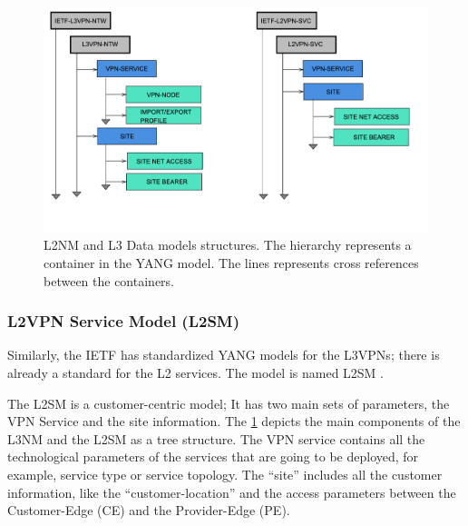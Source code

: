 \documentclass[10pt, conference]{IEEEtran}
\begin{document}

\begin{figure}
	\centering
		\includegraphics[width=\linewidth]{figs/diagram-10.png}
	\caption{L2NM and L3 Data models structures. The hierarchy represents a container in the YANG model. The  lines represents cross references between the containers.}
	\label{FIG:l3nm} 
\end{figure}

\subsubsection{L2VPN Service Model (L2SM)}
\label{section:l2nm}

Similarly, the IETF has standardized YANG models for the L3VPNs; there is already a standard for the L2 services. The model is named L2SM \cite{wen2018yang}. 

The L2SM is a customer-centric model; It has two main sets of parameters, the VPN Service and the site information. The \cref{FIG:l3nm} depicts the main components of the L3NM and the L2SM as a tree structure. The VPN service contains all the technological parameters of the services that are going to be deployed, for example, service type or service topology. The ``site'' includes all the customer information, like the ``customer-location'' and the access parameters between the Customer-Edge (CE) and the Provider-Edge (PE).
\end{document}
